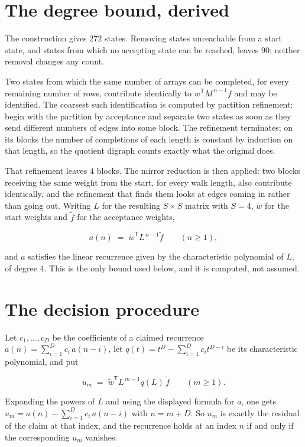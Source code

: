 \documentclass[11pt]{article}
\theoremstyle{definition}
\begin{document}
\section{The degree bound, derived}

The construction gives $272$ states. Removing states unreachable from a start state, and states from which no accepting state can be reached, leaves $90$; neither removal changes any count.

Two states from which the same number of arrays can be completed, for every remaining number of rows, contribute identically to $w^{\mathsf T}M^{\,n-1}f$ and may be identified. The coarsest such identification is computed by partition refinement: begin with the partition by acceptance and separate two states as soon as they send different numbers of edges into some block. The refinement terminates; on its blocks the number of completions of each length is constant by induction on that length, so the quotient digraph counts exactly what the original does.

That refinement leaves $4$ blocks. The mirror reduction is then applied: two blocks receiving the same weight from the start, for every walk length, also contribute identically, and the refinement that finds them looks at edges coming in rather than going out. Writing $L$ for the resulting $S \times S$ matrix with $S = 4$, $\tilde w$ for the start weights and $\tilde f$ for the acceptance weights,

\[a(n) \;=\; \tilde w^{\mathsf T} L^{\,n-1} \tilde f \qquad (n \ge 1),\]

and $a$ satisfies the linear recurrence given by the characteristic polynomial of $L$, of degree $4$. This is the only bound used below, and it is computed, not assumed.

\section{The decision procedure}

Let $c_1,\dots,c_D$ be the coefficients of a claimed recurrence $a(n) = \sum_{i=1}^{D} c_i\,a(n-i)$, let $q(t) = t^{D} - \sum_{i=1}^{D} c_i t^{D-i}$ be its characteristic polynomial, and put

\[u_m \;=\; \tilde w^{\mathsf T} L^{\,m-1} q(L)\,\tilde f \qquad (m \ge 1).\]

Expanding the powers of $L$ and using the displayed formula for $a$, one gets $u_m = a(n) - \sum_{i=1}^{D} c_i\,a(n-i)$ with $n = m + D$. So $u_m$ is exactly the residual of the claim at that index, and the recurrence holds at an index $n$ if and only if the corresponding $u_m$ vanishes.
\end{document}
